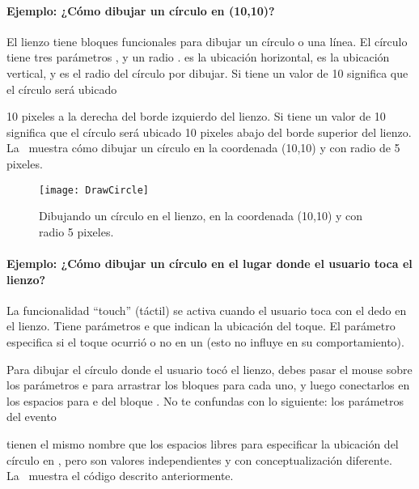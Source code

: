 {{\paragraph{Ejemplo: ¿Cómo dibujar un círculo en (10,10)?}

El lienzo tiene bloques funcionales para dibujar un círculo o una
línea. El círculo tiene tres parámetros ,  y
un radio .  es la ubicación
horizontal,  es la ubicación vertical, y  es
el radio del círculo por dibujar. Si  tiene un valor de
10 significa que el círculo será ubicado {10 pixeles a la derecha del
  borde izquierdo del lienzo. Si  tiene un valor de 10
  significa que el círculo será ubicado 10 pixeles abajo del borde
  superior del lienzo. La~ muestra cómo dibujar
  un círculo en la coordenada (10,10) y con radio de 5 pixeles.

\begin{figure}[H]
\centering
\texttt{[image: DrawCircle]}
\caption{Dibujando un círculo en el lienzo, en la coordenada (10,10) y
  con radio 5 pixeles.}
\label{fig:DrawCircle}
\end{figure}

\paragraph{Ejemplo: ¿Cómo dibujar un círculo en el lugar donde el
  usuario toca el lienzo?}

La funcionalidad ``touch'' (táctil) se activa cuando el usuario toca
con el dedo en el lienzo. Tiene parámetros 
e  que indican la ubicación del toque. El
parámetro  especifica si el toque ocurrió o no
en un  (esto no influye en su comportamiento).

Para dibujar el círculo donde el usuario tocó el lienzo, debes pasar
el mouse sobre los parámetros  e  para
arrastrar los bloques  para cada uno, y luego conectarlos
en los espacios para  e  del bloque
. No te confundas con lo siguiente: los
parámetros del evento } tienen el mismo nombre que los espacios
libres para especificar la ubicación del círculo en
, pero son valores independientes y con
conceptualización diferente. La~ muestra el
código descrito anteriormente.

}}
